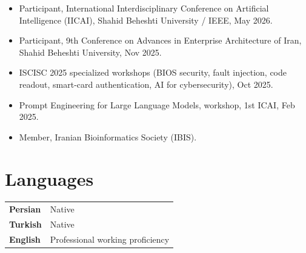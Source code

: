 \documentclass[11pt,a4paper]{article}
\newcommand{\subheader}[1]{%
  \vspace{0.35em}{\bfseries\normalsize #1}\par\vspace{0.2em}%
}
\begin{document}
\subheader{Conferences \& memberships}
\begin{itemize}
  \item Participant, International Interdisciplinary Conference on Artificial Intelligence (IICAI), Shahid Beheshti University / IEEE, May 2026.
  \item Participant, 9th Conference on Advances in Enterprise Architecture of Iran, Shahid Beheshti University, Nov 2025.
  \item ISCISC 2025 specialized workshops (BIOS security, fault injection, code readout, smart-card authentication, AI for cybersecurity), Oct 2025.
  \item Prompt Engineering for Large Language Models, workshop, 1st ICAI, Feb 2025.
  \item Member, Iranian Bioinformatics Society (IBIS).
\end{itemize}

\section*{Languages}

\begin{tabularx}{\textwidth}{@{}>{\bfseries}p{2.4cm} X @{}}
Persian & Native\\[0.12em]
Turkish & Native\\[0.12em]
English & Professional working proficiency\\
\end{tabularx}
\end{document}
